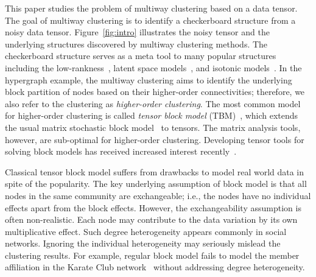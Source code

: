 \documentclass[lettersize,onecolumn,journal]{IEEEtran}
\theoremstyle{definition}
\theoremstyle{definition}
\def\fixme#1#2{\textbf{\color{red}[FIXME (#1): #2]}}
\begin{document}


This paper studies the problem of multiway clustering based on a data tensor. The goal of multiway clustering is to identify a checkerboard structure from a noisy data tensor. Figure~\ref{fig:intro} illustrates the noisy tensor and the underlying structures discovered by multiway clustering methods. The checkerboard structure serves as a meta tool to many popular structures including the low-rankness~\citep{young2018universality}, latent space models~\citep{wang2018learning}, and isotonic models~\citep{pananjady2020isotonic}. In the hypergraph example, the multiway clustering aims to identify the underlying block partition of nodes based on their higher-order connectivities; therefore, we also refer to the clustering as \emph{higher-order clustering}. The most common model for higher-order clustering is called \emph{tensor block model} (TBM)~\citep{wang2019multiway}, which extends the usual matrix stochastic block model~\citep{abbe2017community} to tensors. 
The matrix analysis tools, however, are sub-optimal for higher-order clustering. Developing tensor tools for solving block models has received increased interest recently~\citep{ wang2019multiway,chi2020provable,han2020exact}. 


Classical tensor block model suffers from drawbacks to model real world data in spite of the popularity. The key underlying assumption of block model is that all nodes in the same community are exchangeable; i.e., the nodes have no individual effects apart from the block effects. However, the exchangeability assumption is often non-realistic. Each node may contribute to the data variation by its own multiplicative effect. Such degree heterogeneity appears commonly in social networks. {\color{blue} Ignoring the individual heterogeneity may seriously mislead the clustering results.} For example, regular block model fails to model {\color{blue} the member affiliation in} the Karate Club network~\citep{bickel2009nonparametric} without addressing
degree heterogeneity. 
\end{document}
